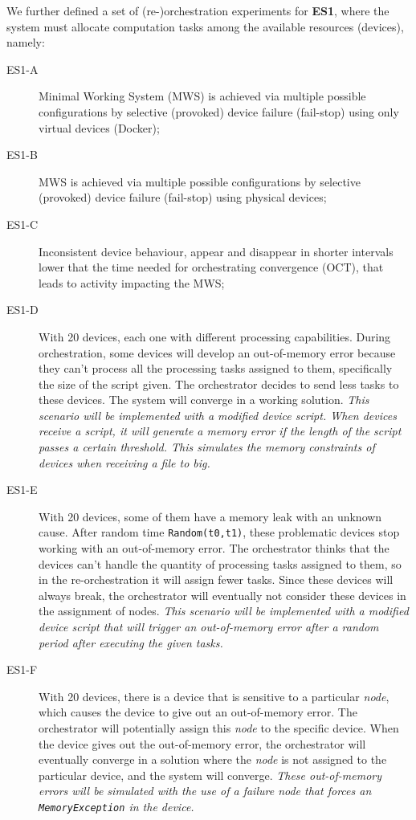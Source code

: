 We further defined a set of (re-)orchestration experiments for \textbf{ES1}, where the system must allocate computation tasks among the available resources (\ie devices), namely:
\begin{description}
    \item[ES1-A] Minimal Working System (MWS) is achieved via multiple possible configurations by selective (provoked) device failure (fail-stop) using only virtual devices (\ie Docker);
    \item[ES1-B] MWS is achieved via multiple possible configurations by selective (provoked) device failure (fail-stop) using physical devices;
    \item[ES1-C] Inconsistent device behaviour, \eg appear and disappear in shorter intervals lower that the time needed for orchestrating convergence (OCT), that leads to activity impacting the MWS;
    \item[ES1-D] With 20 devices, each one with different processing capabilities. During orchestration, some devices will develop an out-of-memory error because they can't process all the processing tasks assigned to them, specifically the size of the script given. The orchestrator decides to send less tasks to these devices. The system will converge in a working solution. \textit{This scenario will be implemented with a modified device script. When devices receive a script, it will generate a memory error if the length of the script passes a certain threshold. This simulates the memory constraints of devices when receiving a file to big.}
    \item[ES1-E] With 20 devices, some of them have a memory leak with an unknown cause. After random time \texttt{Random(t0,t1)}, these problematic devices stop working with an out-of-memory error. The orchestrator thinks that the devices can't handle the quantity of processing tasks assigned to them, so in the re-orchestration it will assign fewer tasks. Since these devices will always break, the orchestrator will eventually not consider these devices in the assignment of nodes. \textit{This scenario will be implemented with a modified device script that will trigger an out-of-memory error after a random period after executing the given tasks.}
    \item[ES1-F] With 20 devices, there is a device that is sensitive to a particular \textit{node}, which causes the device to give out an out-of-memory error. The orchestrator will potentially assign this \textit{node} to the specific device. When the device gives out the out-of-memory error, the orchestrator will eventually converge in a solution where the \textit{node} is not assigned to the particular device, and the system will converge.  \textit{These out-of-memory errors will be simulated with the use of a failure \textit{node} that forces an \texttt{MemoryException} in the device.}

\end{description}
